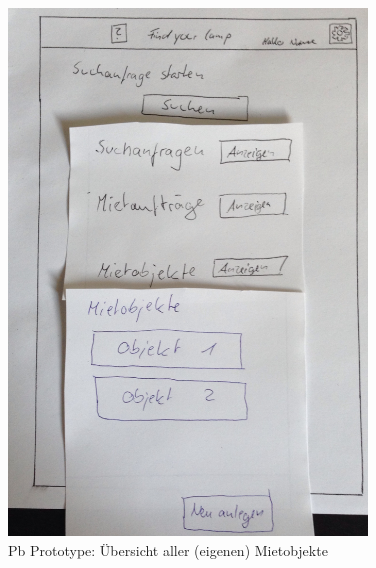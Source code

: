 \begin{figure}[H]
\centering
\includegraphics[angle=90, width=0.85\textwidth]{./images/paperbased/objekte.JPG}
\caption{Pb Prototype: Übersicht aller (eigenen) Mietobjekte}
\label{pbprototype9}
\end{figure}

